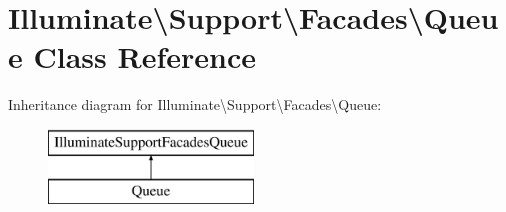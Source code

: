 \hypertarget{class_illuminate_1_1_support_1_1_facades_1_1_queue}{}\section{Illuminate\textbackslash{}Support\textbackslash{}Facades\textbackslash{}Queue Class Reference}
\label{class_illuminate_1_1_support_1_1_facades_1_1_queue}
Inheritance diagram for Illuminate\textbackslash{}Support\textbackslash{}Facades\textbackslash{}Queue\+:\begin{figure}[H]
\begin{center}
\leavevmode
\includegraphics[height=2.000000cm]{class_illuminate_1_1_support_1_1_facades_1_1_queue}
\end{center}
\end{figure}
